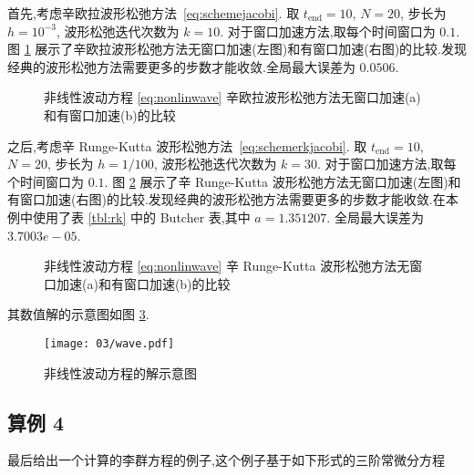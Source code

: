首先,考虑辛欧拉波形松弛方法~\eqref{eq:schemejacobi}. 取 $t_{\text{end}} = 10$, $N=20$, 步长为 $h = 10^{-3}$, 波形松弛迭代次数为 $k=10$. 对于窗口加速方法,取每个时间窗口为 $0.1$. 图 \ref{fig:ex3seucom} 展示了辛欧拉波形松弛方法无窗口加速(左图)和有窗口加速(右图)的比较.发现经典的波形松弛方法需要更多的步数才能收敛.全局最大误差为 $0.0506$.

\begin{figure}[h!]
  \centering
  \caption{非线性波动方程 \eqref{eq:nonlinwave} 辛欧拉波形松弛方法无窗口加速(a)和有窗口加速(b)的比较}
  \label{fig:ex3seucom}
\end{figure}

之后,考虑辛 Runge-Kutta 波形松弛方法~\eqref{eq:schemerkjacobi}. 取 $t_{\text{end}} = 10$, $N=20$, 步长为 $h = 1/100$, 波形松弛迭代次数为 $k=30$. 对于窗口加速方法,取每个时间窗口为 $0.1$. 图 \ref{fig:ex3srkcom} 展示了辛 Runge-Kutta 波形松弛方法无窗口加速(左图)和有窗口加速(右图)的比较.发现经典的波形松弛方法需要更多的步数才能收敛.在本例中使用了表 \ref{tbl:rk} 中的 Butcher 表,其中 $a = 1.351207$. 全局最大误差为 $3.7003e-05$.

\begin{figure}[h!]
  \centering
  \caption{非线性波动方程 \eqref{eq:nonlinwave} 辛 Runge-Kutta 波形松弛方法无窗口加速(a)和有窗口加速(b)的比较}
  \label{fig:ex3srkcom}
\end{figure}

其数值解的示意图如图 \ref{fig:wavefig}.

\begin{figure}[h!]
  \centering
  \texttt{[image: 03/wave.pdf]}
  \caption{非线性波动方程的解示意图}
  \label{fig:wavefig}
\end{figure}

\subsection*{算例 4}
最后给出一个计算的李群方程的例子,这个例子基于如下形式的三阶常微分方程

